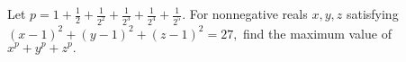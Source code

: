 Let $p = 1+\frac{1}{2}+\frac{1}{2^2}+\frac{1}{2^3}+\frac{1}{2^4}+\frac{1}{2^5}. $ For nonnegative reals $x, y,z$ satisfying $(x-1)^2 + (y-1)^2 + (z-1)^2 = 27,$ find the maximum value of $x^p + y^p + z^p.$